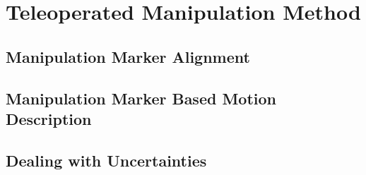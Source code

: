 \section{Teleoperated Manipulation Method}
	\label{sec:teleop_manip_method}

	\subsection{Manipulation Marker Alignment}
	
	\subsection{Manipulation Marker Based Motion Description}
	
	\subsection{Dealing with Uncertainties}